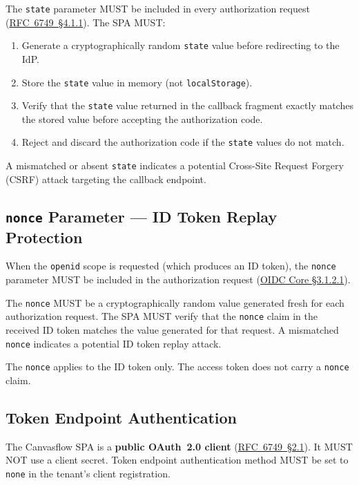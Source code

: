 The \texttt{state} parameter MUST be included in every authorization request
(\href{https://tools.ietf.org/html/rfc6749\#section-4.1.1}{RFC~6749~\S4.1.1}). 
The SPA MUST:

\begin{enumerate}
  \item Generate a cryptographically random \texttt{state} value before redirecting to
    the IdP.
  \item Store the \texttt{state} value in memory (not \texttt{localStorage}).
  \item Verify that the \texttt{state} value returned in the callback fragment exactly
    matches the stored value before accepting the authorization code.
  \item Reject and discard the authorization code if the \texttt{state} values do not
    match.
\end{enumerate}

A mismatched or absent \texttt{state} indicates a potential Cross-Site Request Forgery
(CSRF) attack targeting the callback endpoint.

\subsection{\texttt{nonce} Parameter --- ID Token Replay Protection}



When the \texttt{openid} scope is requested (which produces an ID token), the
\texttt{nonce} parameter MUST be included in the authorization request
(\href{https://openid.net/specs/openid-connect-core-1_0.html#AuthRequest}{OIDC Core \S3.1.2.1}).

The \texttt{nonce} MUST be a cryptographically random value generated fresh for each
authorization request. The SPA MUST verify that the \texttt{nonce} claim in the received
ID token matches the value generated for that request. A mismatched \texttt{nonce}
indicates a potential ID token replay attack.

The \texttt{nonce} applies to the ID token only. The access token does not carry a
\texttt{nonce} claim.

\subsection{Token Endpoint Authentication}\label{sec:token-endpoint-authentication}

The Canvasflow SPA is a \textbf{public OAuth~2.0 client} 
(\href{https://tools.ietf.org/html/rfc6749\#section-2.1}{RFC~6749~\S2.1}). It MUST NOT
use a client secret. Token endpoint authentication method MUST be set to \texttt{none}
in the tenant's client registration.

